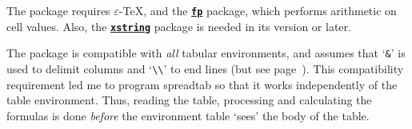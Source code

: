 \documentclass[a4paper,10pt]{article}
\newcommand\ST{\textsf{spreadtab}\xspace}
\newcommand\falseverb[1]{\texttt{\detokenize{#1}}}
\begin{document}
The package requires $\varepsilon$-\TeX, \LaTeXe{} and the \href{http://www.ctan.org/tex-archive/macros/latex/contrib/fp/}{\texttt{\textbf{fp}}} package, which performs arithmetic on cell values. Also, the \href{http://www.ctan.org/tex-archive/macros/latex/contrib/xstring/}{\texttt{\textbf{xstring}}} package is needed in its \falseverb{v1.5d [2010/03/28]} version or later.\medskip

The package is compatible with \emph{all} tabular environments, and assumes that `\verb=&=' is used to delimit columns and `\verb-\\-' to end lines (but see page~\pageref{STeol}). This  compatibility requirement led me to program \ST so that it works independently of the table environment. Thus, reading the table, processing and calculating the formulas is done \emph{before} the environment table `sees' the body of the table.\medskip
\end{document}
